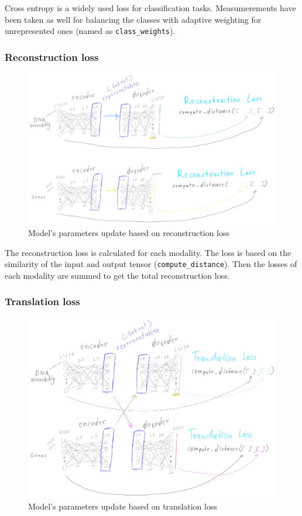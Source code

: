 \documentclass[12pt, a4paper]{article}
\begin{document}
Cross entropy is a widely used loss for classification tasks. Measumerements have been taken as well for balancing the classes with adaptive weighting for unrepresented ones (named as \verb|class_weights|).

\clearpage


\subsubsection{Reconstruction loss}

\begin{figure}[h!]
  \centering
  \includegraphics[width=\textwidth]{reconstruction_loss.png}
  \caption{Model's parameters update based on reconstruction loss}
\end{figure}


The reconstruction loss is calculated for each modality. The loss is based on the similarity of the input and output tensor (\verb|compute_distance|). Then the losses of each modality are summed to get the total reconstruction loss.


\clearpage

\subsubsection{Translation loss}

\begin{figure}[h!]
  \centering
  \includegraphics[width=\textwidth]{translation_loss.png}
  \caption{Model's parameters update based on translation loss}
\end{figure}
\end{document}
